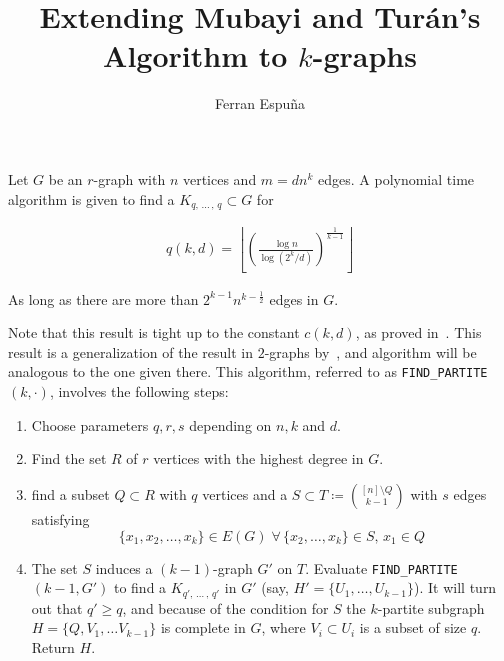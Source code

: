 \documentclass[12pt]{article}
\author{Ferran Espuña}
\date{} %
\begin{document}
    \title{Extending Mubayi and Turán's Algorithm to $k$-graphs}

    \maketitle

    Let $G$ be an $r$-graph with $n$ vertices and $m = dn^k$ edges.
    A polynomial time algorithm is given to find a $K_{q,\, \ldots\, ,\, q} \subset G$ for

    \begin{align*}
        q (k, d) = \left\lfloor \left(  \frac{\log n}{\log (2^k/d)} \right)^{\frac{1}{k-1}} \right\rfloor
        \label{eq:q}
    \end{align*}

    As long as there are more than $2^{k-1}n^{k-\frac{1}{2}}$ edges in $G$.
    
    Note that this result is tight up to the constant $c(k, d)$,
    as proved in~\cite{Erods1964}.
    This result is a generalization of the result in $2$-graphs by~\cite{MUBAYI2010174},
    and algorithm will be analogous to the one given there.
    This algorithm, referred to as \verb|FIND_PARTITE|$(k, \cdot)$, involves the following steps:

    \begin{enumerate}
        \item Choose parameters $q, r, s$ depending on $n, k$ and $d$. \label{step:choose_parameters}

        \item Find the set $R$ of $r$ vertices with the highest degree in $G$. \label{step:find_R}

        \item find a subset $Q \subset R$ with $q$ vertices and a
        $S \subset T \coloneqq \binom{[n] \setminus Q}{k-1}$ with $s$ edges satisfying
        \[\{x_1, x_2, \ldots, x_k\} \in E(G) \; \forall \, \{x_2, \ldots, x_k\} \in S, \, x_1 \in Q\] \label{step:find_Q_S}

        \item The set $S$ induces a $(k-1)$-graph $G'$ on $T$.
        Evaluate \verb|FIND_PARTITE|$(k-1, G')$ to find a $K_{q',\, \ldots\, ,\, q'}$ in $G'$
        (say, $H' = \{U_1, \ldots, U_{k-1}\}$). It will turn out that $q' \geq q$,
        and because of the condition for $S$ the $k$-partite subgraph $H = \{Q, V_1, \ldots V_{k-1}\}$
        is complete in $G$, where $V_i \subset U_i$ is a subset of size $q$.
        Return $H$.

    \end{enumerate}
\end{document}

